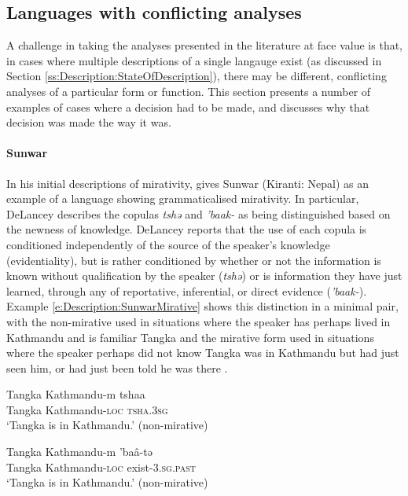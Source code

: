 \subsection{Languages with conflicting analyses}\label{ss:Description:Conflicts}
A challenge in taking the analyses presented in the literature at face value is that, in cases where multiple descriptions of a single langauge exist (as discussed in Section \ref{ss:Description:StateOfDescription}), there may be different, conflicting analyses of a particular form or function. This section presents a number of examples of cases where a decision had to be made, and discusses why that decision was made the way it was. 

\paragraph{Sunwar}
In his initial descriptions of mirativity,  gives Sunwar (Kiranti: Nepal) as an example of a language showing grammaticalised mirativity. In particular, DeLancey describes the copulas \textit{tshə} and \textit{'baak-} as being distinguished based on the newness of knowledge. DeLancey reports that the use of each copula is conditioned independently of the source of the speaker's knowledge (evidentiality), but is rather conditioned by whether or not the information is known without qualification by the speaker (\textit{tshə}) or is information they have just learned, through any of reportative, inferential, or direct evidence (\textit{'baak-}). Example \ref{e:Description:SunwarMirative} shows this distinction in a minimal pair, with the non-mirative used in situations where the speaker has perhaps lived in Kathmandu and is familiar Tangka and the mirative form used in situations where the speaker perhaps did not know Tangka was in Kathmandu but had just seen him, or had just been told he was there \cite[42]{DeLanceyMirativity1997}.

\begin{exe}
        \ex\label{e:Description:SunwarMirative}
        \begin{xlist}
                \ex 
                \gll Tangka Kathmandu-m tshaa \\
                Tangka Kathmandu-\textsc{loc} \textsc{tsha.3sg} \\
                \glt `Tangka is in Kathmandu.' (non-mirative)

                \ex
                \gll Tangka Kathmandu-m 'baâ-tə \\
                Tangka Kathmandu-\textsc{loc} exist-\textsc{3.sg.past} \\
                \glt `Tangka is in Kathmandu.' (non-mirative)
        \end{xlist}
        \cite[Sunwar][41-42]{DeLanceyMirativity1997}
\end{exe}

